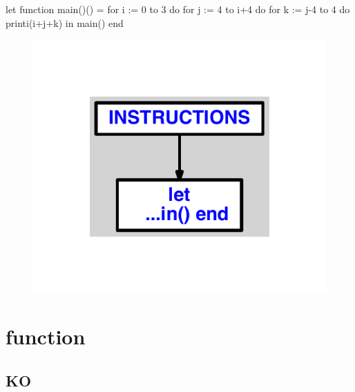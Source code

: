 \documentclass{article}
\begin{document}
\begin{verbatimtab}
let
	function main()() =
		for i := 0 to 3 do
			for j := 4 to i+4 do
				for k := j-4 to 4 do
					printi(i+j+k)
in main() end
\end{verbatimtab}
\begin{figure}[H]\centering\includegraphics[max width=\textwidth]{ast/ast_203.pdf}\end{figure}\section{function}
\subsection{KO}
\end{document}
